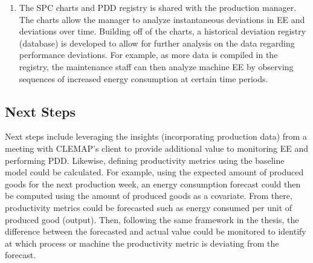 \begin{enumerate}
    \item The SPC charts and PDD registry is shared with the production manager. The charts allow the manager to analyze instantaneous deviations in EE and deviations over time. Building off of the charts, a historical deviation registry (database) is developed to allow for further analysis on the data regarding performance deviations. For example, as more data is compiled in the registry, the maintenance staff can then analyze machine EE by observing sequences of increased energy consumption at certain time periods.
    
\end{enumerate}

\subsection{Next Steps}

Next steps include leveraging the insights (incorporating production data) from a meeting with CLEMAP's client to provide additional value to monitoring EE and performing PDD. Likewise, defining productivity metrics using the baseline model could be calculated. For example, using the expected amount of produced goods for the next production week, an energy consumption forecast could then be computed using the amount of produced goods as a covariate. From there, productivity metrics could be forecasted such as energy consumed per unit of produced good (output). Then, following the same framework in the thesis, the difference between the forecasted and actual value could be monitored to identify at which process or machine the productivity metric is deviating from the forecast. 